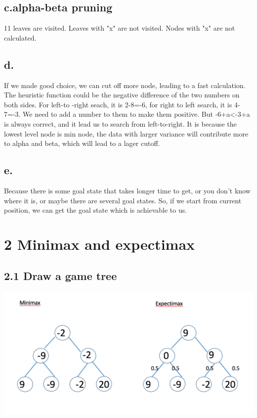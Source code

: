 \documentclass[12pt]{article}
\begin{document}
\subsection{c.alpha-beta pruning}
11 leaves are visited.  Leaves with "x" are not visited. Nodes with "x" are not calculated.

\subsection{d.}
If we made good choice, we can cut off more node, leading to a fast calculation. The heuristic function could be the negative difference of the two numbers on both sides. For left-to -right seach, it is 2-8=-6, for right to left search, it is 4-7=-3. We need to add a number to them to make them positive. But -6+a<-3+a is always correct, and it lead us to search from left-to-right. It is because the lowest level node is min node, the data with larger variance will contribute more to alpha and beta, which will lead to a lager cutoff.

\subsection{e.}
Because there is some goal state that takes longer time to get, or you don't know where it is, or maybe there are several goal states. So, if we start from current position, we can get the goal state which is achievable to us. 





\section{2 Minimax and expectimax}
\subsection{2.1 Draw a game tree}

			\includegraphics[scale=0.7]{p1.png}
	
\end{document}

